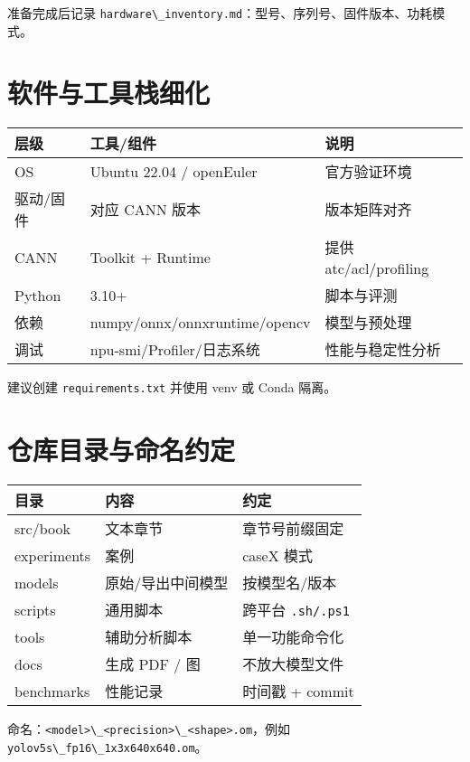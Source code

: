 准备完成后记录
\passthrough{\lstinline!hardware\_inventory.md!}：型号、序列号、固件版本、功耗模式。

\section{软件与工具栈细化}\label{ux8f6fux4ef6ux4e0eux5de5ux5177ux6808ux7ec6ux5316}

\begin{longtable}[]{@{}lll@{}}
\toprule\noalign{}
层级 & 工具/组件 & 说明 \\
\midrule\noalign{}
\endhead
\bottomrule\noalign{}
\endlastfoot
OS & Ubuntu 22.04 / openEuler & 官方验证环境 \\
驱动/固件 & 对应 CANN 版本 & 版本矩阵对齐 \\
CANN & Toolkit + Runtime & 提供 atc/acl/profiling \\
Python & 3.10+ & 脚本与评测 \\
依赖 & numpy/onnx/onnxruntime/opencv & 模型与预处理 \\
调试 & npu-smi/Profiler/日志系统 & 性能与稳定性分析 \\
\end{longtable}

建议创建 \passthrough{\lstinline!requirements.txt!} 并使用 venv 或 Conda
隔离。

\section{仓库目录与命名约定}\label{ux4ed3ux5e93ux76eeux5f55ux4e0eux547dux540dux7ea6ux5b9a}

\begin{longtable}[]{@{}lll@{}}
\toprule\noalign{}
目录 & 内容 & 约定 \\
\midrule\noalign{}
\endhead
\bottomrule\noalign{}
\endlastfoot
src/book & 文本章节 & 章节号前缀固定 \\
experiments & 案例 & caseX 模式 \\
models & 原始/导出中间模型 & 按模型名/版本 \\
scripts & 通用脚本 & 跨平台 \passthrough{\lstinline!.sh/.ps1!} \\
tools & 辅助分析脚本 & 单一功能命令化 \\
docs & 生成 PDF / 图 & 不放大模型文件 \\
benchmarks & 性能记录 & 时间戳 + commit \\
\end{longtable}

命名：\passthrough{\lstinline!<model>\_<precision>\_<shape>.om!}，例如
\passthrough{\lstinline!yolov5s\_fp16\_1x3x640x640.om!}。

